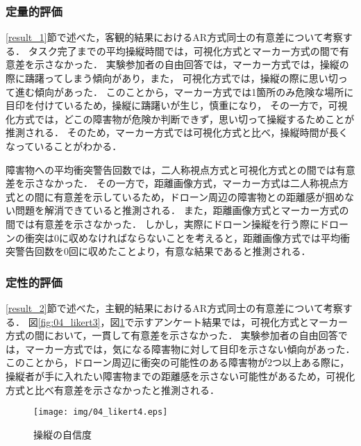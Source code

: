 \documentclass[submit]{ipsj}
\begin{document}
\subsubsection{定量的評価}
\ref{result_1}節で述べた，客観的結果におけるAR方式同士の有意差について考察する．
タスク完了までの平均操縦時間では，可視化方式とマーカー方式の間で有意差を示さなかった．
実験参加者の自由回答では，マーカー方式では，操縦の際に躊躇ってしまう傾向があり，また，
可視化方式では，操縦の際に思い切って進む傾向があった．
このことから，マーカー方式では1箇所のみ危険な場所に目印を付けているため，操縦に躊躇いが生じ，慎重になり，
その一方で，可視化方式では，どこの障害物が危険か判断できず，思い切って操縦するためことが推測される．
そのため，マーカー方式では可視化方式と比べ，操縦時間が長くなっていることがわかる．
\par
障害物への平均衝突警告回数では，二人称視点方式と可視化方式との間では有意差を示さなかった．
その一方で，距離画像方式，マーカー方式は二人称視点方式との間に有意差を示しているため，ドローン周辺の障害物との距離感が掴めない問題を解消できていると推測される．
また，距離画像方式とマーカー方式の間では有意差を示さなかった．
しかし，実際にドローン操縦を行う際にドローンの衝突は0に収めなければならないことを考えると，距離画像方式では平均衝突警告回数を0回に収めたことより，有意な結果であると推測される．

\subsubsection{定性的評価}
\ref{result_2}節で述べた，主観的結果におけるAR方式同士の有意差について考察する．
図\ref{fig:04_likert3}，図\ref{fig:04_likert4}で示すアンケート結果では，可視化方式とマーカー方式の間において，一貫して有意差を示さなかった．
実験参加者の自由回答では，マーカー方式では，気になる障害物に対して目印を示さない傾向があった．
このことから，ドローン周辺に衝突の可能性のある障害物が2つ以上ある際に，操縦者が手に入れたい障害物までの距離感を示さない可能性があるため，可視化方式と比べ有意差を示さなかったと推測される．


\begin{figure}[tb]
\centering
\texttt{[image: img/04\_likert4.eps]}
\caption{操縦の自信度}
\label{fig:04_likert4}
\end{figure}

\end{document}
